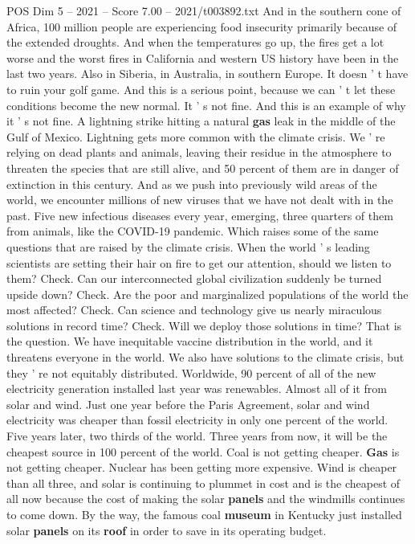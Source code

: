 \begin{textsample}{POS Dim 5 – 2021 – Score 7.00 – 2021/t003892.txt}
And in the southern cone of Africa, 100 million people are experiencing food insecurity primarily because of the extended droughts.
And when the temperatures go up, the fires get a lot worse and the worst fires in California and western US history have been in the last two years.
Also in Siberia, in Australia, in southern Europe.
It doesn ' t have to ruin your golf game.
And this is a serious point, because we can ' t let these conditions become the new normal.
It ' s not fine.
And this is an example of why it ' s not fine.
A lightning strike hitting a natural \textbf{gas} leak in the middle of the Gulf of Mexico.
Lightning gets more common with the climate crisis.
We ' re relying on dead plants and animals, leaving their residue in the atmosphere to threaten the species that are still alive, and 50 percent of them are in danger of extinction in this century.
And as we push into previously wild areas of the world, we encounter millions of new viruses that we have not dealt with in the past.
Five new infectious diseases every year, emerging, three quarters of them from animals, like the COVID-19 pandemic.
Which raises some of the same questions that are raised by the climate crisis.
When the world ' s leading scientists are setting their hair on fire to get our attention, should we listen to them?
Check.
Can our interconnected global civilization suddenly be turned upside down?
Check.
Are the poor and marginalized populations of the world the most affected?
Check.
Can science and technology give us nearly miraculous solutions in record time?
Check.
Will we deploy those solutions in time?
That is the question.
We have inequitable vaccine distribution in the world, and it threatens everyone in the world.
We also have solutions to the climate crisis, but they ' re not equitably distributed.
Worldwide, 90 percent of all of the new electricity generation installed last year was renewables.
Almost all of it from solar and wind.
Just one year before the Paris Agreement, solar and wind electricity was cheaper than fossil electricity in only one percent of the world.
Five years later, two thirds of the world.
Three years from now, it will be the cheapest source in 100 percent of the world.
Coal is not getting cheaper. \textbf{Gas} is not getting cheaper.
Nuclear has been getting more expensive.
Wind is cheaper than all three, and solar is continuing to plummet in cost and is the cheapest of all now because the cost of making the solar \textbf{panels} and the windmills continues to come down.
By the way, the famous coal \textbf{museum} in Kentucky just installed solar \textbf{panels} on its \textbf{roof} in order to save in its operating budget.

\end{textsample}
